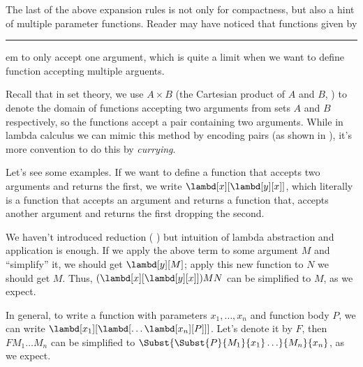 \documentclass[../../../include/open-logic-section]{subfiles}
\begin{document}

The last of the above expansion rules is not only for compactness, but
also a hint of multiple parameter functions. Reader may have noticed
that functions given by \rule[ABS] seem to only accept one argument, which
is quite a limit when we want to define function accepting multiple
arguents.

Recall that in set theory, we use $A \times B$ (the Cartesian product
of $A$ and $B$, \olref[sfr][set][pai]) to denote the domain of functions accepting two
arguments from sets $A$ and $B$ respectively, so the functions accept
a pair containing two arguments. While in lambda calculus we can mimic
this method by encoding pairs (as shown in ), it's
more convention to do this by \emph{currying}.

Let's see some examples. If we want to define a function that accepts
two arguments and returns the first, we write
$\lambd[x][\lambd[y][x]]$, which literally is a function that accepts
an argument and returns a function that, accepts another argument and
returns the first dropping the second. 

We haven't introduced reduction ( ) but intuition
of lambda abstraction and application is enough. If we apply the above
term to some argument $M$ and ``simplify'' it, we should get $\lambd[y][M]$; apply this new function to $N$
we should get $M$. Thus, $(\lambd[x][\lambd[y][x]])MN$ can be
simplified to $M$, as we expect.

In general, to write a function with parameters $x_1, \ldots, x_n$
and function body $P$, we can write
$\lambd[x_1][\lambd[\ldots\lambd[x_n][P]]]$. Let's denote it by $F$,
then $FM_1\ldots M_n$ can be simplified to
$\Subst{\Subst{P}{M_1}{x_1}\ldots}{M_n}{x_n}$, as we expect.
\end{document}
